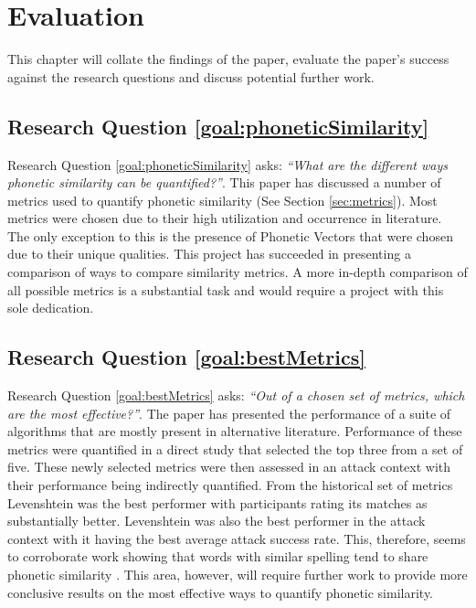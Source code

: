 \chapter{Evaluation}
This chapter will collate the findings of the paper, evaluate the paper's success against the research questions and discuss potential further work.

\section{Research Question \ref{goal:phoneticSimilarity}}

Research Question \ref{goal:phoneticSimilarity} asks: \textit{``What are the different ways phonetic similarity can be quantified?''}. This paper has discussed a number of metrics used to quantify phonetic similarity (See Section \ref{sec:metrics}). Most metrics were chosen due to their high utilization and occurrence in literature. The only exception to this is the presence of Phonetic Vectors that were chosen due to their unique qualities. This project has succeeded in presenting a comparison of ways to compare similarity metrics. A more in-depth comparison of all possible metrics is a substantial task and would require a project with this sole dedication.

\section{Research Question \ref{goal:bestMetrics}}
Research Question \ref{goal:bestMetrics} asks: \textit{``Out of a chosen set of metrics, which are the most effective?''}. 
The paper has presented the performance of a suite of algorithms that are mostly present in alternative literature. Performance of these metrics were quantified in a direct study that selected the top three from a set of five. These newly selected metrics were then assessed in an attack context with their performance being indirectly quantified. From the historical set of metrics Levenshtein was the best performer with participants rating its matches as substantially better. Levenshtein was also the best performer in the attack context with it having the best average attack success rate. This, therefore, seems to corroborate work showing that words with similar spelling tend to share phonetic similarity \cite{hettiarachchi2012sparcl}. This area, however, will require further work to provide more conclusive results on the most effective ways to quantify phonetic similarity.

